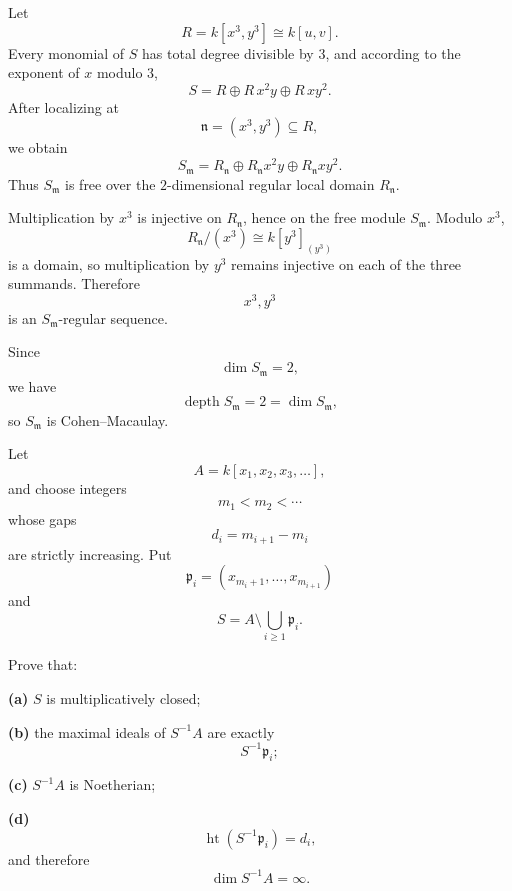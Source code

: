 \begin{solution}
Let
\[
R=k[x^3,y^3]\cong k[u,v].
\]
Every monomial of \(S\) has total degree divisible by \(3\), and according
to the exponent of \(x\) modulo \(3\),
\[
S=R\oplus R\,x^2y\oplus R\,xy^2.
\]
After localizing at
\[
\mathfrak n=(x^3,y^3)\subseteq R,
\]
we obtain
\[
S_{\mathfrak m}
=
R_{\mathfrak n}
\oplus
R_{\mathfrak n}x^2y
\oplus
R_{\mathfrak n}xy^2.
\]
Thus \(S_{\mathfrak m}\) is free over the \(2\)-dimensional regular local
domain \(R_{\mathfrak n}\).

Multiplication by \(x^3\) is injective on \(R_{\mathfrak n}\), hence on the
free module \(S_{\mathfrak m}\). Modulo \(x^3\),
\[
R_{\mathfrak n}/(x^3)
\cong
k[y^3]_{(y^3)}
\]
is a domain, so multiplication by \(y^3\) remains injective on each of the
three summands. Therefore
\[
x^3,y^3
\]
is an \(S_{\mathfrak m}\)-regular sequence.

Since
\[
\dim S_{\mathfrak m}=2,
\]
we have
\[
\operatorname{depth}S_{\mathfrak m}=2=\dim S_{\mathfrak m},
\]
so \(S_{\mathfrak m}\) is Cohen--Macaulay.
\end{solution}


\begin{problem}[CP-V-0057]
\label{prob:cp-v-0057}
Let
\[
A=k[x_1,x_2,x_3,\dots],
\]
and choose integers
\[
m_1<m_2<\cdots
\]
whose gaps
\[
d_i=m_{i+1}-m_i
\]
are strictly increasing. Put
\[
\mathfrak p_i=(x_{m_i+1},\dots,x_{m_{i+1}})
\]
and
\[
S=A\setminus\bigcup_{i\ge1}\mathfrak p_i.
\]

Prove that:

\textbf{(a)} \(S\) is multiplicatively closed;

\textbf{(b)} the maximal ideals of \(S^{-1}A\) are exactly
\[
S^{-1}\mathfrak p_i;
\]

\textbf{(c)} \(S^{-1}A\) is Noetherian;

\textbf{(d)}
\[
\operatorname{ht}(S^{-1}\mathfrak p_i)=d_i,
\]
and therefore
\[
\dim S^{-1}A=\infty.
\]
\end{problem}

